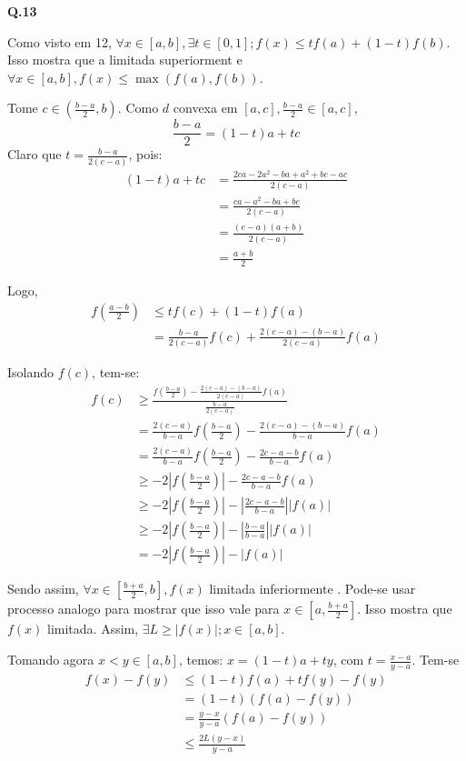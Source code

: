\textbf{Q.13}

Como visto em 12, $\forall x \in [a,b], \exists t \in [0,1]; f(x)\le tf(a) + (1-t)f(b)$. Isso mostra que a \funcao \eh limitada superiorment e  $\forall x \in [a,b], f(x) \le \max(f(a), f(b))$.

Tome $c \in (\frac{b-a}{2},b)$. Como $d$ convexa em $[a,c], \frac{b-a}{2} \in [a,c]$,
$$
\frac{b-a}{2} = (1-t)a + tc
$$
Claro que $t = \frac{b-a}{2(c-a)}$, pois:
\vspace{-0.5cm}
\begin{align*}
	(1-t)a + tc &= \frac{2ca - 2a^2 -ba + a^2 + bc - 	ac}{2(c-a)}\\
	&=\frac{ca - a^2 -ba + bc}{2(c-a)}\\
	&=\frac{(c-a)(a + b)}{2(c-a)}\\
	&= \frac{a+b}{2}
\end{align*}

Logo,
\begin{align*}
	f(\frac{a-b}{2}) &\leq tf(c) + (1-t)f(a)\\
	&= \frac{b-a}{2(c-a)}f(c) + \frac{2(c-a) - (b-a)}{2(c-a)}f(a)
\end{align*}

Isolando $f(c)$, tem-se:
\begin{align*}
	f(c) &\ge \frac{f(\frac{b-a}{2}) - \frac{2(c-a) - (b-a)}{2(c-a)}f(a)}{\frac{b-a}{2(c-a)}} \\
	&= \frac{2(c-a)}{b-a}f(\frac{b-a}{2}) - \frac{2(c-a) - (b-a)}{b-a}f(a)\\
	&= \frac{2(c-a)}{b-a}f(\frac{b-a}{2}) - \frac{2c -a - b}{b-a}f(a)\\
	&\ge -2|f(\frac{b-a}{2})| - \frac{2c -a - b}{b-a}f(a)\\
	&\ge -2|f(\frac{b-a}{2})| - |\frac{2c -a - b}{b-a}||f(a)|\\
	&\ge -2|f(\frac{b-a}{2})| - |\frac{b -a}{b-a}||f(a)| \\
	&= -2|f(\frac{b-a}{2})| - |f(a)|
\end{align*}

Sendo assim, $\forall x\in[\frac{b+a}{2}, b], f(x)$ \eh limitada inferiormente \tambem. Pode-se usar processo analogo para mostrar que isso \tambem vale para $x\in[a,\frac{b+a}{2}]$. Isso mostra que $f(x)$ \eh limitada. Assim, $\exists L \ge |f(x)|; x\in [a,b]$.

Tomando agora $x < y \in [a,b]$, temos:
$x = (1-t)a + ty$, com $t = \frac{x-a}{y-a}$. Tem-se
\begin{align*}
	f(x) - f(y) &\leq (1-t)f(a) + tf(y) - f(y) \\
	&= (1-t)(f(a) - f(y))\\
	&= \frac{y-x}{y-a}(f(a) - f(y))\\
	&\leq \frac{2L(y-x)}{y-a}
\end{align*}

